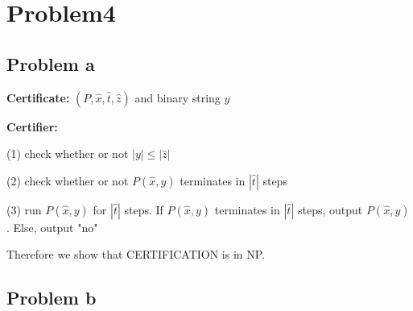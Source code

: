 \documentclass[openany]{article}
\begin{document}
\section*{Problem4}
\subsection*{Problem a}

\textbf{Certificate:} $(P, \hat{x}, \hat{t}, \hat{z})$ and binary string $y$

\textbf{Certifier:} 

(1) check whether or not $|y| \leqslant |\hat{z}|$

(2) check whether or not $P(\hat{x},y)$ terminates in $|\hat{t}|$ steps


(3) run $P(\hat{x},y)$ for $|\hat{t}|$ steps. If $P(\hat{x},y)$ terminates in $|\hat{t}|$ steps, output $P(\hat{x},y)$. Else, output "no"

Therefore we show that CERTIFICATION is in NP.

\subsection*{Problem b}
\end{document}
